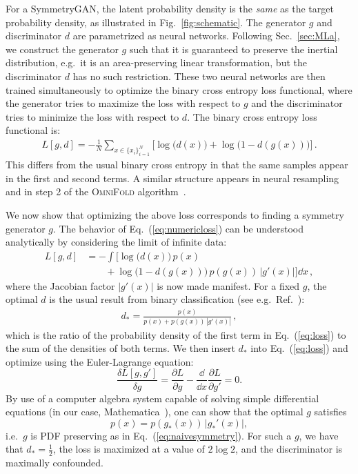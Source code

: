 \documentclass[aps,prx,reprint,preprintnumbers,superscriptaddress,nofootinbib,longbibliography,floatfix]{revtex4-1}
\DeclareRobustCommand{\Sec}[1]{Sec.~\ref{sec:#1}}
\DeclareRobustCommand{\Fig}[1]{Fig.~\ref{fig:#1}}
\DeclareRobustCommand{\Eq}[1]{Eq.~(\ref{eq:#1})}
\DeclareRobustCommand{\Ref}[1]{Ref.~\cite{#1}}
\begin{document}
For a SymmetryGAN, the latent probability density is the \emph{same} as the target probability density, as illustrated in \Fig{schematic}.
%
The generator $g$ and discriminator $d$ are parametrized as neural networks.
%
Following \Sec{MLa}, we construct the generator $g$ such that it is guaranteed to preserve the inertial distribution, e.g.\ it is an area-preserving linear transformation, but the discriminator $d$ has no such restriction.
%
These two neural networks are then trained simultaneously to optimize the binary cross entropy loss functional, where the generator tries to maximize the loss with respect to $g$ and the discriminator tries to minimize the loss with respect to $d$.
%
The binary cross entropy loss functional is:
%
\begin{align}
\label{eq:numericloss}
    L[g,d]=-\frac1N\sum_{x\in\{x_i\}_{i=1}^N}\Big[\log\big(d(x)\big) + \log\big(1-d(g(x))\big)\Big]\,.
\end{align}
%
This differs from the usual binary cross entropy in that the same samples appear in the first and second terms.
%
A similar structure appears in neural resampling~\cite{Nachman:2020fff} and in step 2 of the \textsc{OmniFold} algorithm~\cite{Andreassen:2019cjw}.

We now show that optimizing the above loss corresponds to finding a symmetry generator $g$.
%
The behavior of \Eq{numericloss} can be understood analytically by considering the limit of infinite data:
%
\begin{align}\nonumber
    L[g,d]&=-\int \Big[\log\big(d(x)\big) \, p(x)\\\label{eq:loss}
    &\qquad+\log\big(1-d(g(x))\big)\, p(g(x))\, |g'(x)|\Big]\dd x\,,
\end{align}
%
where the Jacobian factor $|g'(x)|$ is now made manifest.
%
For a fixed $g$, the optimal $d$ is the usual result from binary classification (see e.g.\ \Ref{hastie01statisticallearning,sugiyama_suzuki_kanamori_2012}):
%
\begin{align}
\label{eq:optimalf}
    d_*=\frac{p(x)}{p(x)+p(g(x)) \, |g'(x)|}\,,
\end{align}
%
which is the ratio of the probability density of the first term in \Eq{loss} to the sum of the densities of both terms.
%
We then insert $d_*$ into \Eq{loss} and optimize using the Euler-Lagrange equation:
%
\begin{equation}
\frac{\delta L[g,g']}{\delta g}=\frac{\partial L}{\partial g}-\frac{\dd}{\dd x} \frac{\partial L}{\partial g'} = 0.
\end{equation}
%
By use of a computer algebra system capable of solving simple differential equations (in our case, Mathematica~\cite{Mathematica}), one can show that the optimal $g$ satisfies
%
\begin{equation}
p(x)=p(g_*(x)) \, |g_{*}'(x)|,
\end{equation}
%
i.e.\ $g$ is PDF preserving as in \Eq{naivesymmetry}.
%
For such a $g$, we have that $d_* = \frac12$, the loss is maximized at a value of $2 \log 2$, and the discriminator is maximally confounded.
\end{document}
